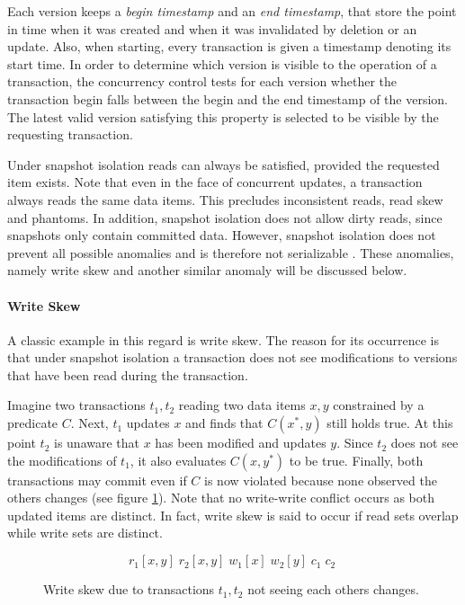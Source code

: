 Each version keeps a \textit{begin timestamp} and an \textit{end timestamp},
that store the point in time when it was created and when it was invalidated by
deletion or an update. Also, when starting, every transaction is given a
timestamp denoting its start time. In order to determine which version is
visible to the operation of a transaction, the concurrency control tests for
each version whether the transaction begin falls between the begin and the end
timestamp of the version. The latest valid version satisfying this property is
selected to be visible by the requesting transaction.

Under snapshot isolation reads can always be satisfied, provided the requested
item exists. Note that even in the face of concurrent updates, a transaction
always reads the same data items. This precludes inconsistent reads, read skew
and phantoms. In addition, snapshot isolation does not allow dirty reads, since
snapshots only contain committed data. However, snapshot isolation does not
prevent all possible anomalies and is therefore not serializable
\cite{berenson1995critique}. These anomalies, namely write skew and another
similar anomaly will be discussed below.

\paragraph{Write Skew}

A classic example in this regard is write skew. The reason for its occurrence is
that under snapshot isolation a transaction does not see modifications to
versions that have been read during the transaction.

Imagine two transactions $t_1, t_2$ reading two data items $x, y$ constrained by
a predicate $C$. Next, $t_1$ updates $x$ and finds that $C(x^{*}, y)$ still
holds true. At this point $t_2$ is unaware that $x$ has been modified and
updates $y$. Since $t_2$ does not see the modifications of $t_1$, it also
evaluates $C(x, y^{*})$ to be true. Finally, both transactions may commit even
if $C$ is now violated because none observed the others changes (see figure
\ref{fig:write_skew}). Note that no write-write conflict occurs as both updated
items are distinct. In fact, write skew is said to occur if read sets overlap
while write sets are distinct.

\begin{figure}
    \centering
    \[
        r_1[x,y]\; r_2[x,y]\; w_1[x]\; w_2[y]\; c_1\; c_2\;
    \]
    \caption{Write skew due to transactions $t_1, t_2$ not seeing each others changes.}
    \label{fig:write_skew}
\end{figure}

